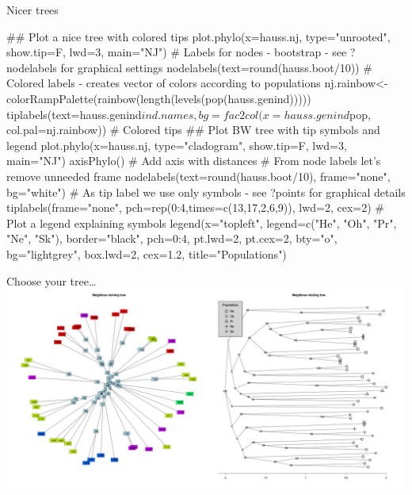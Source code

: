 \documentclass[compress, ucs, xelatex, 11pt, xcolor=svgnames,
  hyperref={
    bookmarks=true,
    unicode=true,
    colorlinks=true,
    pdftitle={Molecular data in R},
    plainpages=false,
    pdfauthor={Vojtech Zeisek},
    pdfsubject={Course about phylogeny and evolution in R},
    pdfcreator={XeLaTeX},
    pdfkeywords={R, evolution, phylogeny, molecular data},
    linkcolor=Tomato,
    anchorcolor=SaddleBrown,
    citecolor=Goldenrod,
    filecolor=DarkMagenta,
    menucolor=Sienna,
    urlcolor=DarkTurquoise,
    pdftex},
  url={hyphens, lowtilde} %
  ]{beamer}
\begin{document}
\begin{frame}[fragile]{Nicer trees}
  \begin{footnotesize}
  \begin{spluscode}
    ## Plot a nice tree with colored tips
    plot.phylo(x=hauss.nj, type="unrooted", show.tip=F, lwd=3, main="NJ")
    # Labels for nodes - bootstrap - see ?nodelabels for graphical settings
    nodelabels(text=round(hauss.boot/10))
    # Colored labels - creates vector of colors according to populations
    nj.rainbow<-colorRampPalette(rainbow(length(levels(pop(hauss.genind)))))
    tiplabels(text=hauss.genind$ind.names, bg=fac2col(x=hauss.genind$pop,
      col.pal=nj.rainbow)) # Colored tips
    ## Plot BW tree with tip symbols and legend
    plot.phylo(x=hauss.nj, type="cladogram", show.tip=F, lwd=3, main="NJ")
    axisPhylo() # Add axis with distances
    # From node labels let's remove unneeded frame
    nodelabels(text=round(hauss.boot/10), frame="none", bg="white")
    # As tip label we use only symbols - see ?points for graphical details
    tiplabels(frame="none", pch=rep(0:4,times=c(13,17,2,6,9)), lwd=2, cex=2)
    # Plot a legend explaining symbols
    legend(x="topleft", legend=c("He", "Oh", "Pr", "Ne", "Sk"), 
      border="black", pch=0:4, pt.lwd=2, pt.cex=2, bty="o", bg="lightgrey",
      box.lwd=2, cex=1.2, title="Populations")
  \end{spluscode}
  \end{footnotesize}
\end{frame}

\begin{frame}{Choose your tree\ldots}
\includegraphics[width=\textwidth]{nj2.png}
\end{frame}
\end{document}
